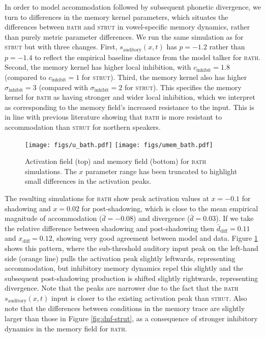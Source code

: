 \documentclass[10pt,letterpaper]{article}
\begin{document}
In order to model accommodation followed by subsequent phonetic divergence, we turn to differences in the memory kernel parameters, which situates the differences between \textsc{bath} and \textsc{strut} in vowel-specific memory dynamics, rather than purely metric parameter differences. We run the same simulation as for \textsc{strut} but with three changes. First, $s_{\text{auditory}}(x,t)$ has $p = -1.2$ rather than $p = -1.4$ to reflect the empirical baseline distance from the model talker for \textsc{bath}. Second, the memory kernel has higher local inhibition, with $c_{\text{inhibit}} = 1.8$ (compared to $c_{\text{inhibit}} = 1$ for \textsc{strut}). Third, the memory kernel also has higher $\sigma_{\text{inhibit}} = 3$ (compared with $\sigma_{\text{inhibit}} = 2$ for \textsc{strut}). This specifies the memory kernel for \textsc{bath} as having stronger and wider local inhibition, which we interpret as corresponding to the memory field's increased resistance to the input. This is in line with previous literature showing that \textsc{bath} is more resistant to accommodation than \textsc{strut} for northern speakers.

\begin{figure}
\centering
\texttt{[image: figs/u\_bath.pdf]}
\texttt{[image: figs/umem\_bath.pdf]}
\caption{Activation field (top) and memory field (bottom) for \textsc{bath} simulations. The $x$ parameter range has been truncated to highlight small differences in the activation peaks.}
\label{fig:dnf-bath}
\end{figure}

The resulting simulations for \textsc{bath} show peak activation values at $x = - 0.1$ for shadowing and $x = 0.02$ for post-shadowing, which is close to the mean empirical magnitude of accommodation ($\bar{d} = -0.08$) and divergence ($\bar{d} = 0.03$). If we take the relative difference between shadowing and post-shadowing then $\bar{d}_{\text{diff}} = 0.11$ and $ x_{\text{diff}} = 0.12$, showing very good agreement between model and data. Figure \ref{fig:dnf-bath} shows this pattern, where the sub-threshold auditory input peak on the left-hand side (orange line) pulls the activation peak slightly leftwards, representing accommodation, but inhibitory memory dynamics repel this slightly and the subsequent post-shadowing production is shifted slightly rightwards, representing divergence. Note that the peaks are narrower due to the fact that the \textsc{bath} $s_{\text{auditory}}(x,t)$ input is closer to the existing activation peak than \textsc{strut}. Also note that the differences between conditions in the memory trace are slightly larger than those in Figure \ref{fig:dnf-strut}, as a consequence of stronger inhibitory dynamics in the memory field for \textsc{bath}.
\end{document}
